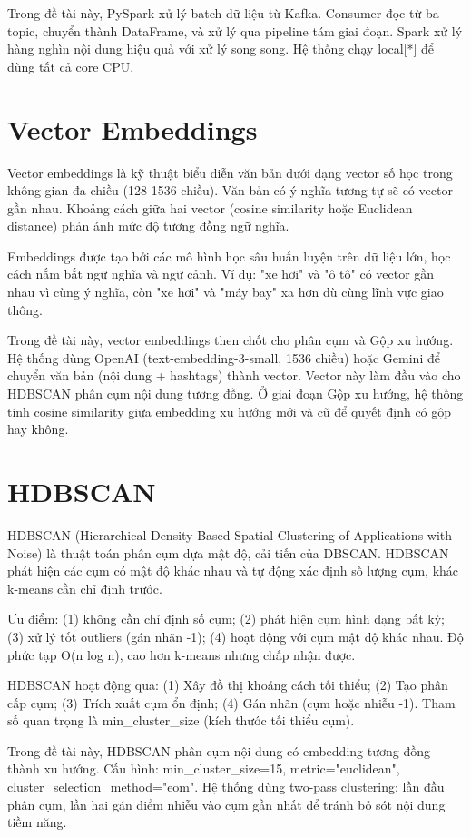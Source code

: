 Trong đề tài này, PySpark xử lý batch dữ liệu từ Kafka. Consumer đọc từ ba topic, chuyển thành DataFrame, và xử lý qua pipeline tám giai đoạn. Spark xử lý hàng nghìn nội dung hiệu quả với xử lý song song. Hệ thống chạy local[*] để dùng tất cả core CPU.

\section{Vector Embeddings}

Vector embeddings là kỹ thuật biểu diễn văn bản dưới dạng vector số học trong không gian đa chiều (128-1536 chiều). Văn bản có ý nghĩa tương tự sẽ có vector gần nhau. Khoảng cách giữa hai vector (cosine similarity hoặc Euclidean distance) phản ánh mức độ tương đồng ngữ nghĩa.

Embeddings được tạo bởi các mô hình học sâu huấn luyện trên dữ liệu lớn, học cách nắm bắt ngữ nghĩa và ngữ cảnh. Ví dụ: "xe hơi" và "ô tô" có vector gần nhau vì cùng ý nghĩa, còn "xe hơi" và "máy bay" xa hơn dù cùng lĩnh vực giao thông.

Trong đề tài này, vector embeddings then chốt cho phân cụm và Gộp xu hướng. Hệ thống dùng OpenAI (text-embedding-3-small, 1536 chiều) hoặc Gemini để chuyển văn bản (nội dung + hashtags) thành vector. Vector này làm đầu vào cho HDBSCAN phân cụm nội dung tương đồng. Ở giai đoạn Gộp xu hướng, hệ thống tính cosine similarity giữa embedding xu hướng mới và cũ để quyết định có gộp hay không.

\section{HDBSCAN}

HDBSCAN (Hierarchical Density-Based Spatial Clustering of Applications with Noise) là thuật toán phân cụm dựa mật độ, cải tiến của DBSCAN. HDBSCAN phát hiện các cụm có mật độ khác nhau và tự động xác định số lượng cụm, khác k-means cần chỉ định trước.

Ưu điểm: (1) không cần chỉ định số cụm; (2) phát hiện cụm hình dạng bất kỳ; (3) xử lý tốt outliers (gán nhãn -1); (4) hoạt động với cụm mật độ khác nhau. Độ phức tạp O(n log n), cao hơn k-means nhưng chấp nhận được.

HDBSCAN hoạt động qua: (1) Xây đồ thị khoảng cách tối thiểu; (2) Tạo phân cấp cụm; (3) Trích xuất cụm ổn định; (4) Gán nhãn (cụm hoặc nhiễu -1). Tham số quan trọng là min\_cluster\_size (kích thước tối thiểu cụm).

Trong đề tài này, HDBSCAN phân cụm nội dung có embedding tương đồng thành xu hướng. Cấu hình: min\_cluster\_size=15, metric="euclidean", cluster\_selection\_method="eom". Hệ thống dùng two-pass clustering: lần đầu phân cụm, lần hai gán điểm nhiễu vào cụm gần nhất để tránh bỏ sót nội dung tiềm năng.

